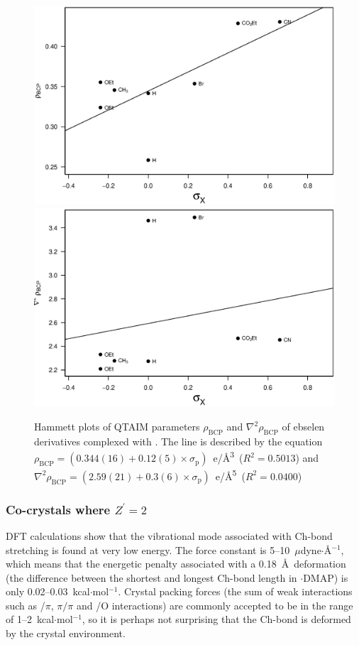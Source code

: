 \begin{refsection}
\begin{figure}
  \centering
  \includegraphics[width=0.45\linewidth]{Figures/hammett-rho-morph.eps}
  \includegraphics[width=0.45\linewidth]{Figures/hammett-lapl-morph.eps}
  \caption[Hammett plots of QTAIM parameters $\rho_\text{BCP}$ and $\nabla^2\rho_{\text{BCP}}$ of ebselen derivatives complexed with .]{Hammett plots of QTAIM parameters $\rho_\text{BCP}$ and $\nabla^2\rho_{\text{BCP}}$ of ebselen derivatives complexed with . The line is described by the equation $\rho_{\text{BCP}} = (0.344(16) + 0.12(5) \times \sigma_\text{p})$~e/\AA\textsuperscript{3}~($R^2=0.5013$) and $\nabla^2\rho_{\text{BCP}} = (2.59(21) + 0.3(6) \times \sigma_\text{p})$~e/\AA\textsuperscript{5}~($R^2=0.0400$)}\label{fig:hammett-qtaim-morph}
\end{figure}

\FloatBarrier

\subsubsection{Co-crystals where \texorpdfstring{$Z^\prime=2$}{Z'=2}}\label{sec:z2}
DFT calculations show that the vibrational mode associated with Ch-bond stretching is found at very low energy.
The force constant is 5--10~$\mu$dyne$ \cdot $\AA$^{-1}$, which means that the energetic penalty associated with a 0.18~\AA\ deformation (the difference between the shortest and longest Ch-bond length in $ \cdot $DMAP) is only 0.02--0.03~kcal$ \cdot $mol$^{-1}$.
Crystal packing forces (the sum of weak interactions such as /$\pi$, $\pi /\pi$ and /O interactions) are commonly accepted to be in the range of 1--2~kcal$ \cdot $mol$^{-1}$, so it is perhaps not surprising that the Ch-bond is deformed by the crystal environment.\autocite{Dunitz1988}


\end{refsection}
